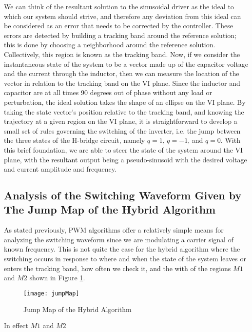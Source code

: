 We can think of the resultant solution to the sinusoidal driver as the ideal to which our system should strive, and therefore any deviation from this ideal can be considered as an error that needs to be corrected by the controller. These errors are detected by building a tracking band around the reference solution; this is done by choosing a neighborhood around the reference solution. Collectively, this region is known as the tracking band. Now, if we consider the instantaneous state of the system to be a vector made up of the capacitor voltage and the current through the inductor, then we can measure the location of the vector in relation to the tracking band on the VI plane. Since the inductor and capacitor are at all times 90 degrees out of phase without any load or perturbation, the ideal solution takes the shape of an ellipse on the VI plane. By taking the state vector's position relative to the tracking band, and knowing the trajectory at a given region on the VI plane, it is straightforward to develop a small set of rules governing the switching of the inverter, i.e. the jump between the three states of the H-bridge circuit, namely $q=1$, $q=-1$, and $q=0$. With this brief foundation, we are able to steer the state of the system around the VI plane, with the resultant output being a pseudo-sinusoid with the desired voltage and current amplitude and frequency. 

\subsection{Analysis of the Switching Waveform Given by The Jump Map of the Hybrid Algorithm}
As stated previously, PWM algorithms offer a relatively simple means for analyzing the switching waveform since we are modulating a carrier signal of known frequency. This is not quite the case for the hybrid algorithm where the switching occurs in response to where and when the state of the system leaves or enters the tracking band, how often we check it, and the with of the regions $M1$ and $M2$ shown in Figure \ref{jump}.

\begin{figure}[htbp]
\begin{center}
\texttt{[image: jumpMap]}
\caption{Jump Map of the Hybrid Algorithm}
\label{jump}
\end{center}
\end{figure}

In effect $M1$ and $M2$
